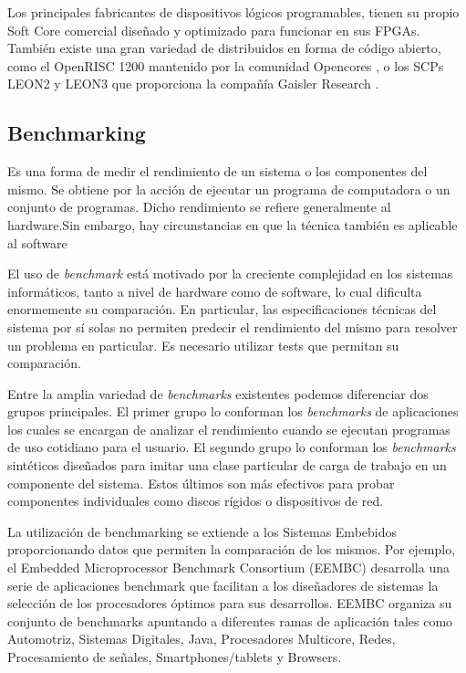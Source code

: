 \documentclass[conference]{IEEEtran}
\begin{document}
	Los principales fabricantes de dispositivos lógicos programables, tienen su propio Soft Core comercial diseñado y optimizado para funcionar en sus FPGAs. También existe una gran variedad de distribuidos en forma de código abierto, como el OpenRISC 1200 \cite{Etiqueta19} mantenido por la comunidad Opencores \cite{Etiqueta20}, o los  SCPs
	LEON2 y LEON3 \cite{Etiqueta21} \cite{Etiqueta22} que proporciona la compañía Gaisler Research \cite{Etiqueta23}.



\subsection{Benchmarking}%

Es una forma de medir el rendimiento de un sistema o los componentes del mismo. Se obtiene por la acción de ejecutar un programa de computadora o un conjunto de programas. Dicho rendimiento se refiere generalmente al hardware.Sin embargo, hay circunstancias en que la técnica también es aplicable al software

El uso de \textit{benchmark} está motivado por la creciente
complejidad en los sistemas informáticos, tanto a nivel de hardware
como de software, lo cual dificulta enormemente su comparación. En
particular, las especificaciones técnicas del sistema por sí solas no
permiten predecir el rendimiento del mismo para resolver un problema
en particular. Es necesario utilizar tests que permitan su
comparación.

Entre la amplia variedad de \textit{benchmarks} existentes podemos
diferenciar dos grupos principales. El primer grupo lo conforman los
\textit{benchmarks} de aplicaciones los cuales se encargan de analizar
el rendimiento cuando se ejecutan programas de uso cotidiano para el
usuario. El segundo grupo lo conforman los \textit{benchmarks}
sintéticos diseñados para imitar una clase particular
de carga de trabajo en un componente del sistema. Estos últimos son
más efectivos para probar componentes individuales como discos rígidos
o dispositivos de red.

La utilización de benchmarking se extiende a los Sistemas Embebidos
proporcionando datos que permiten la comparación de los mismos. Por
ejemplo, el Embedded Microprocessor Benchmark Consortium (EEMBC)
desarrolla una serie de aplicaciones benchmark que facilitan a los
diseñadores de sistemas la selección de los procesadores óptimos para
sus desarrollos. EEMBC organiza su conjunto de benchmarks apuntando a
diferentes ramas de aplicación tales como Automotriz, Sistemas
Digitales, Java, Procesadores Multicore, Redes, Procesamiento de
señales, Smartphones/tablets y Browsers.
	
\end{document}
